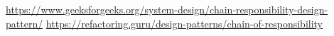 \url{https://www.geeksforgeeks.org/system-design/chain-responsibility-design-pattern/}
\url{https://refactoring.guru/design-patterns/chain-of-responsibility}